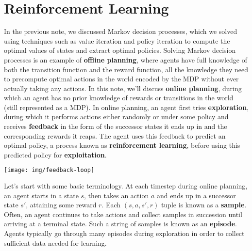 \documentclass[11pt,fleqn]{article}
\def\title{Note \the\lecturenumber}
\begin{document}
\maketitle


\iffalse
\documentclass[11pt,fleqn]{article}
\usepackage{latexsym,epsf,amsmath,amsfonts,graphicx,url}

\title{Note 5}

\newcommand{\F}{\mathbb{F}}
\newcommand{\Z}{\mathbb{Z}}
\newcommand{\Q}{\mathbb{Q}}
\newcommand{\R}{\mathbb{R}}
\newcommand{\C}{\mathbb{C}}

\begin{document}

\maketitle
\fi

\section*{Reinforcement Learning}
In the previous note, we discussed Markov decision processes, which we solved using techniques such as value iteration and policy iteration to compute the optimal values of states and extract optimal policies. Solving Markov decision processes is an example of \textbf{offline planning}, where agents have full knowledge of both the transition function and the reward function, all the knowledge they need to precompute optimal actions in the world encoded by the MDP without ever actually taking any actions. In this note, we'll discuss \textbf{online planning}, during which an agent has no prior knowledge of rewards or transitions in the world (still represented as a MDP). In online planning, an agent first tries \textbf{exploration}, during which it performs actions either randomly or under some policy and receives \textbf{feedback} in the form of the successor states it ends up in and the corresponding rewards it reaps. The agent uses this feedback to predict an optimal policy, a process known as \textbf{reinforcement learning}, before using this predicted policy for \textbf{exploitation}.
\begin{center}	
	\texttt{[image: img/feedback-loop]}
\end{center}
Let's start with some basic terminology. At each timestep during online planning, an agent starts in a state $s$, then takes an action $a$ and ends up in a successor state $s'$, attaining some reward $r$. Each $(s, a, s', r)$ tuple is known as a \textbf{sample}. Often, an agent continues to take actions and collect samples in succession until arriving at a terminal state. Such a string of samples is known as an \textbf{episode}. Agents typically go through many episodes during exploration in order to collect sufficient data needed for learning.


\end{document}
\end{document}
